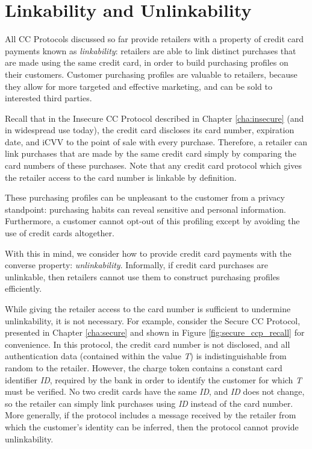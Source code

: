 \section{Linkability and Unlinkability}
\label{sec:unlinkability}

All CC Protocols discussed so far provide retailers with a property of credit card payments known as \emph{linkability}:
    retailers are able to link distinct purchases that are made using the same credit card, in order to build purchasing profiles on their customers.
Customer purchasing profiles are valuable to retailers, because they allow for more targeted and effective marketing, and can be sold to interested third parties.

Recall that in the Insecure CC Protocol described in Chapter \ref{cha:insecure} (and in widespread use today),
  the credit card discloses its card number, expiration date, and iCVV to the point of sale with every purchase.
Therefore, a retailer can link purchases that are made by the same credit card simply by comparing the card numbers of these purchases.
Note that any credit card protocol which gives the retailer access to the card number is linkable by definition.

These purchasing profiles can be unpleasant to the customer from a privacy standpoint:
  purchasing habits can reveal sensitive and personal information.
Furthermore, a customer cannot opt-out of this profiling except by avoiding the use of credit cards altogether.

With this in mind, we consider how to provide credit card payments with the converse property: \emph{unlinkability}.
Informally, if credit card purchases are unlinkable, then retailers cannot use them to construct purchasing profiles efficiently.

While giving the retailer access to the card number is sufficient to undermine unlinkability, it is not necessary.
For example, consider the Secure CC Protocol, presented in Chapter \ref{cha:secure} and shown in Figure \ref{fig:secure_ccp_recall} for convenience.
In this protocol, the credit card number is not disclosed, and all authentication data (contained within the value \emph{T}) is indistinguishable from random to the retailer.
However, the charge token contains a constant card identifier \emph{ID}, required by the bank in order to identify the customer for which \emph{T} must be verified.
No two credit cards have the same \emph{ID}, and \emph{ID} does not change, so the retailer can simply link purchases using \emph{ID} instead of the card number.
More generally, if the protocol includes a message received by the retailer from which the customer's identity can be inferred, then the protocol cannot provide unlinkability.


